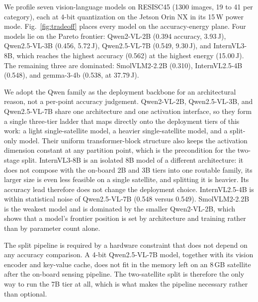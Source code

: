 
We profile seven vision-language models on RESISC45 (1300 images, 19 to 41 per
category), each at 4-bit quantization on the Jetson Orin NX in its 15\,W power
mode. Fig.~\ref{fig:tradeoff} places every model on the accuracy-energy plane.
Four models lie on the Pareto frontier: Qwen2-VL-2B (0.394 accuracy, 3.93\,J),
Qwen2.5-VL-3B (0.456, 5.72\,J), Qwen2.5-VL-7B (0.549, 9.30\,J), and InternVL3-8B,
which reaches the highest accuracy (0.562) at the highest energy (15.00\,J). The
remaining three are dominated: SmolVLM2-2.2B (0.310), InternVL2.5-4B (0.548), and
gemma-3-4b (0.538, at 37.79\,J).

We adopt the Qwen family as the deployment backbone for an architectural reason,
not a per-point accuracy judgement. Qwen2-VL-2B, Qwen2.5-VL-3B, and
Qwen2.5-VL-7B share one architecture and one activation interface, so they form a
single three-tier ladder that maps directly onto the deployment tiers of this
work: a light single-satellite model, a heavier single-satellite model, and a
split-only model. Their uniform transformer-block structure also keeps the
activation dimension constant at any partition point, which is the precondition
for the two-stage split. InternVL3-8B is an isolated 8B model of a different
architecture: it does not compose with the on-board 2B and 3B tiers into one
routable family, its larger size is even less feasible on a single satellite, and
splitting it is heavier. Its accuracy lead therefore does not change the
deployment choice. InternVL2.5-4B is within statistical noise of Qwen2.5-VL-7B
(0.548 versus 0.549). SmolVLM2-2.2B is the weakest model and is dominated by the
smaller Qwen2-VL-2B, which shows that a model's frontier position is set by
architecture and training rather than by parameter count alone.

The split pipeline is required by a hardware constraint that does not depend on
any accuracy comparison. A 4-bit Qwen2.5-VL-7B model, together with its vision
encoder and key-value cache, does not fit in the memory left on an 8\,GB
satellite after the on-board sensing pipeline. The two-satellite split is
therefore the only way to run the 7B tier at all, which is what makes the
pipeline necessary rather than optional.

